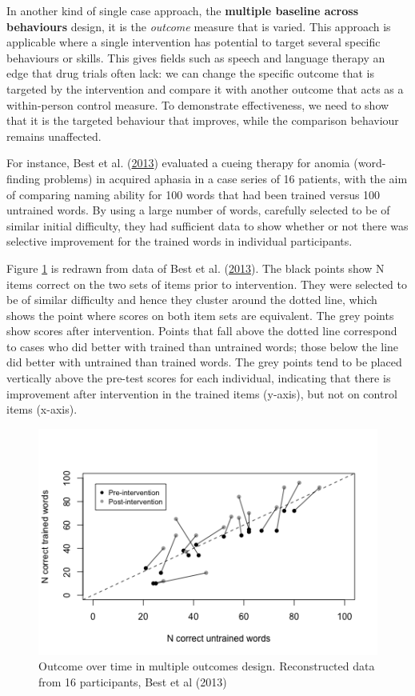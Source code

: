 \documentclass{krantz}
\begin{document}
In another kind of single case approach, the \textbf{multiple baseline across behaviours} design, it is the \emph{outcome} measure that is varied. This approach is applicable where a single intervention has potential to target several specific behaviours or skills. This gives fields such as speech and language therapy an edge that drug trials often lack: we can change the specific outcome that is targeted by the intervention and compare it with another outcome that acts as a within-person control measure. To demonstrate effectiveness, we need to show that it is the targeted behaviour that improves, while the comparison behaviour remains unaffected.

For instance, Best et al. (\protect\hyperlink{ref-best2013}{2013}) evaluated a cueing therapy for anomia (word-finding problems) in acquired aphasia in a case series of 16 patients, with the aim of comparing naming ability for 100 words that had been trained versus 100 untrained words. By using a large number of words, carefully selected to be of similar initial difficulty, they had sufficient data to show whether or not there was selective improvement for the trained words in individual participants.

Figure \ref{fig:bestplot} is redrawn from data of Best et al. (\protect\hyperlink{ref-best2013}{2013}). The black points show N items correct on the two sets of items prior to intervention. They were selected to be of similar difficulty and hence they cluster around the dotted line, which shows the point where scores on both item sets are equivalent. The grey points show scores after intervention. Points that fall above the dotted line correspond to cases who did better with trained than untrained words; those below the line did better with untrained than trained words. The grey points tend to be placed vertically above the pre-test scores for each individual, indicating that there is improvement after intervention in the trained items (y-axis), but not on control items (x-axis).

\begin{figure}
\includegraphics[width=0.75\linewidth]{images_bw/bestplot} \caption{Outcome over time in multiple outcomes design. Reconstructed data from 16 participants, Best et al (2013)}\label{fig:bestplot}
\end{figure}
\end{document}
